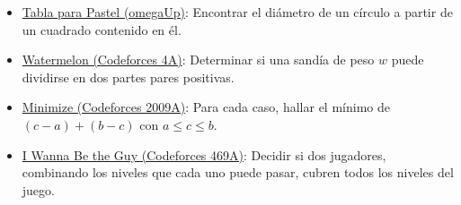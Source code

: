 \begin{itemize}
    \item \href{https://omegaup.com/arena/problem/Tabla-para-pastel/#problems}{Tabla para Pastel (omegaUp)}: Encontrar el diámetro de un círculo a partir de un cuadrado contenido en él.
    \item \href{https://codeforces.com/problemset/problem/4/A}{Watermelon (Codeforces 4A)}: Determinar si una sandía de peso $w$ puede dividirse en dos partes pares positivas.
    \item \href{https://codeforces.com/problemset/problem/2009/A}{Minimize (Codeforces 2009A)}: Para cada caso, hallar el mínimo de $(c-a)+(b-c)$ con $a \leq c \leq b$.
    \item \href{https://codeforces.com/problemset/problem/469/A}{I Wanna Be the Guy (Codeforces 469A)}: Decidir si dos jugadores, combinando los niveles que cada uno puede pasar, cubren todos los niveles del juego.
\end{itemize}